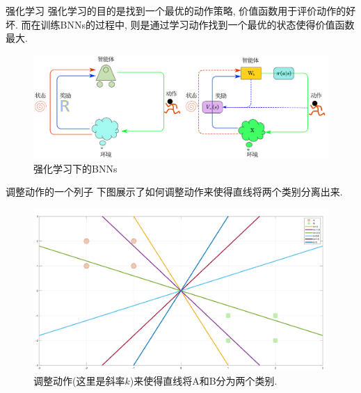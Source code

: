 \documentclass{beamer}
\begin{document}
\begin{frame}{强化学习}
    \footnotesize
    强化学习的目的是找到一个最优的动作策略, 价值函数用于评价动作的好坏. 而在训练BNNs的过程中, 则是通过学习动作找到一个最优的状态使得价值函数最大.
    \begin{figure}
        \centering
        \includegraphics[scale=0.35]{pic/cmp1.pdf}
        \caption{强化学习下的BNNs}
    \end{figure}
\end{frame}


\begin{frame}{调整动作的一个列子}
    \footnotesize
    下图展示了如何调整动作来使得直线将两个类别分离出来.
    \begin{figure}
        \centering
        \includegraphics[scale=0.2]{pic/act1.pdf}
        \caption{调整动作(这里是斜率$k$)来使得直线将A和B分为两个类别.}
    \end{figure}
\end{frame}
\end{document}
